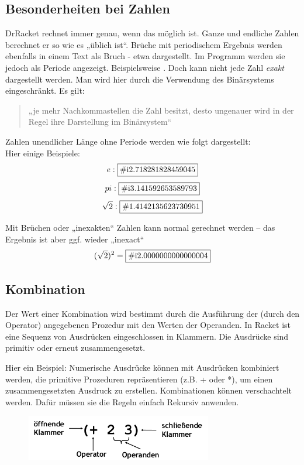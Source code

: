 \subsection{Besonderheiten bei Zahlen}
DrRacket rechnet immer genau, wenn das möglich ist. Ganze und endliche Zahlen berechnet er so wie es „üblich ist“. Brüche mit periodischem Ergebnis werden ebenfalls in einem Text als Bruch - etwa  dargestellt. Im Programm werden sie jedoch als Periode angezeigt. Beispielsweise .
Doch kann nicht jede Zahl \textit{exakt} dargestellt werden. Man wird hier durch die Verwendung des Binärsystems eingeschränkt. Es gilt:
\begin{quote}
	„je mehr Nachkommastellen die Zahl besitzt, desto ungenauer wird in der Regel ihre Darstellung im Binärsystem“
\end{quote}

Zahlen unendlicher Länge ohne Periode werden wie folgt dargestellt: \\
Hier einige Beispiele:
$$e: \fbox{\#i2.718281828459045}$$
$$pi: \fbox{\#i3.141592653589793}$$
$$\sqrt{2}: \fbox{\#1.4142135623730951}$$

Mit Brüchen oder „inexakten“ Zahlen kann normal gerechnet
werden – das Ergebnis ist aber ggf. wieder „inexact“
$$(\sqrt{2})^2 = \fbox{\#i2.0000000000000004}$$

\subsection{Kombination}
Der Wert einer Kombination wird bestimmt durch die Ausführung der (durch den Operator) angegebenen Prozedur mit den Werten der Operanden. In Racket ist eine Sequenz von Ausdrücken eingeschlossen in Klammern. Die Ausdrücke sind primitiv oder erneut zusammengesetzt.



Hier ein Beispiel:
Numerische Ausdrücke können mit Ausdrücken kombiniert werden,
die primitive Prozeduren repräsentieren (z.B. + oder *), um einen
zusammengesetzten Ausdruck zu erstellen.
Kombinationen können verschachtelt werden. Dafür müssen sie die Regeln einfach Rekursiv anwenden.
\begin{figure}
	\begin{center}
		\includegraphics[height=2cm]{Bilder/T01_Sprachelemente_Kombination}
		\caption{}\label{t01_sk}
	\end{center}
\end{figure}

